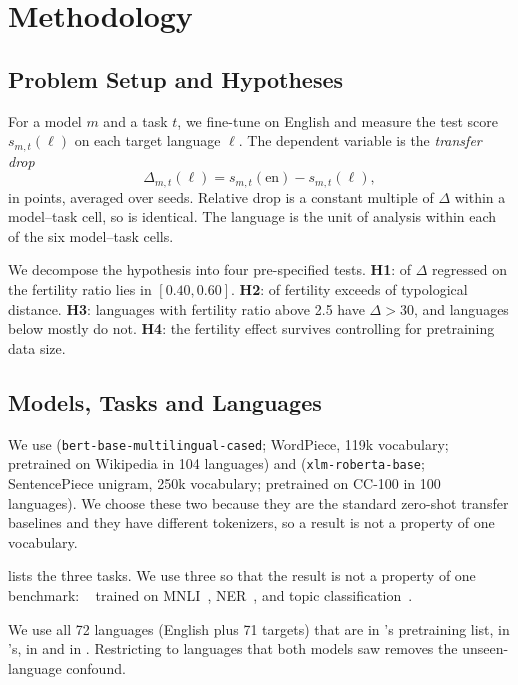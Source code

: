 \section{Methodology}
\label{sec:method}

\subsection{Problem Setup and Hypotheses}
For a model $m$ and a task $t$, we fine-tune on English and measure the test score $s_{m,t}(\ell)$ on each target language $\ell$.
The dependent variable is the \emph{transfer drop}
\begin{equation}
    \Delta_{m,t}(\ell) = s_{m,t}(\text{en}) - s_{m,t}(\ell),
    \label{eq:drop}
\end{equation}
in points, averaged over seeds.
Relative drop is a constant multiple of $\Delta$ within a model--task cell, so \rsq is identical.
The language is the unit of analysis within each of the six model--task cells.

We decompose the hypothesis into four pre-specified tests.
{\bf H1}: \rsq of $\Delta$ regressed on the fertility ratio lies in $[0.40, 0.60]$.
{\bf H2}: \rsq of fertility exceeds \rsq of typological distance.
{\bf H3}: languages with fertility ratio above 2.5 have $\Delta>30$, and languages below mostly do not.
{\bf H4}: the fertility effect survives controlling for pretraining data size.

\subsection{Models, Tasks and Languages}
We use \mbert (\texttt{bert-base-multilingual-cased}; WordPiece, 119k vocabulary; pretrained on Wikipedia in 104 languages) and \xlmr (\texttt{xlm-roberta-base}; SentencePiece unigram, 250k vocabulary; pretrained on CC-100 in 100 languages).
We choose these two because they are the standard zero-shot transfer baselines and they have different tokenizers, so a result is not a property of one vocabulary.

 lists the three tasks.
We use three so that the result is not a property of one benchmark: \xnli~\cite{conneau2018xnli} trained on MNLI~\cite{williams2018mnli}, \wikiann NER~\cite{pan2017wikiann,rahimi2019massively}, and \sib topic classification~\cite{adelani2024sib200}.



We use all 72 languages (English plus 71 targets) that are in \mbert's pretraining list, in \xlmr's, in \flores and in \wikiann.
Restricting to languages that both models saw removes the unseen-language confound.

